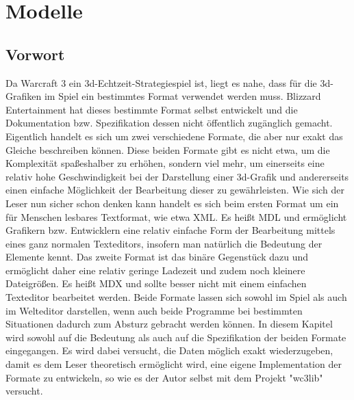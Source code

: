 \chapter{Modelle}

\section{Vorwort}
Da Warcraft 3 ein 3d-Echtzeit-Strategiespiel ist, liegt es nahe, dass für die 3d-Grafiken im Spiel ein bestimmtes Format verwendet werden muss.
Blizzard Entertainment hat dieses bestimmte Format selbst entwickelt und die Dokumentation bzw. Spezifikation dessen nicht öffentlich zugänglich gemacht.
Eigentlich handelt es sich um zwei verschiedene Formate, die aber nur exakt das Gleiche beschreiben können.
Diese beiden Formate gibt es nicht etwa, um die Komplexität spaßeshalber zu erhöhen, sondern viel mehr,
um einerseits eine relativ hohe Geschwindigkeit bei der Darstellung einer 3d-Grafik und andererseits
einen einfache Möglichkeit der Bearbeitung dieser zu gewährleisten.
Wie sich der Leser nun sicher schon denken kann handelt es sich beim ersten Format um ein für Menschen
lesbares Textformat, wie etwa XML. Es heißt MDL und ermöglicht Grafikern bzw. Entwicklern eine relativ
einfache Form der Bearbeitung mittels eines ganz normalen Texteditors, insofern man natürlich die Bedeutung
der Elemente kennt.
Das zweite Format ist das binäre Gegenstück dazu und ermöglicht daher eine relativ geringe Ladezeit und zudem noch kleinere
Dateigrößen.
Es heißt MDX und sollte besser nicht mit einem einfachen Texteditor bearbeitet werden.
Beide Formate lassen sich sowohl im Spiel als auch im Welteditor darstellen, wenn auch beide Programme bei
bestimmten Situationen dadurch zum Absturz gebracht werden können.
In diesem Kapitel wird sowohl auf die Bedeutung als auch auf die Spezifikation der beiden Formate eingegangen. Es wird dabei versucht, die Daten möglich exakt wiederzugeben, damit es dem Leser theoretisch ermöglicht wird, eine eigene Implementation der Formate zu entwickeln, so wie es der Autor selbst mit dem
Projekt "wc3lib" versucht.

